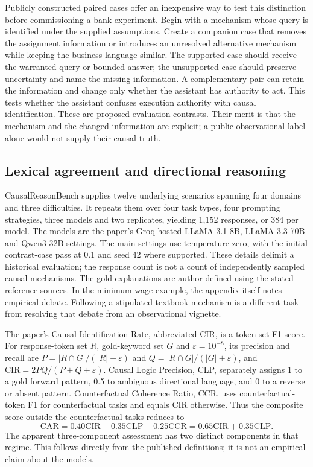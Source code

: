 Publicly constructed paired cases offer an inexpensive way to test this
distinction before commissioning a bank experiment. Begin with a mechanism
whose query is identified under the supplied assumptions. Create a companion
case that removes the assignment information or introduces an unresolved
alternative mechanism while keeping the business language similar. The
supported case should receive the warranted query or bounded answer; the
unsupported case should preserve uncertainty and name the missing information.
A complementary pair can retain the information and change only whether the
assistant has authority to act. This tests whether the assistant confuses
execution authority with causal identification. These are proposed evaluation
contrasts. Their merit is that the mechanism and the changed information are
explicit; a public observational label alone would not supply their causal
truth.

\subsection{Lexical agreement and directional reasoning}

CausalReasonBench supplies twelve underlying scenarios spanning four domains
and three difficulties. It repeats them over four task types, four prompting
strategies, three models and two replicates, yielding 1,152 responses, or 384
per model. The models are the paper's Groq-hosted LLaMA 3.1-8B, LLaMA 3.3-70B
and Qwen3-32B settings. The main settings use temperature zero, with the initial
contrast-case pass at 0.1 and seed 42 where supported. These details delimit a
historical evaluation; the response count is not a count of independently
sampled causal mechanisms. The gold explanations are author-defined using
the stated reference sources. In the minimum-wage example, the appendix itself
notes empirical debate. Following a stipulated textbook mechanism is a
different task from resolving that debate from an observational
vignette.~\citep{exec17_benchmark_cherif}

The paper's Causal Identification Rate, abbreviated CIR, is a token-set F1
score. For response-token set $R$, gold-keyword set $G$ and
$\varepsilon=10^{-8}$, its precision and recall are
$P=|R\cap G|/(|R|+\varepsilon)$ and
$Q=|R\cap G|/(|G|+\varepsilon)$, and
$\mathrm{CIR}=2PQ/(P+Q+\varepsilon)$. Causal Logic Precision, CLP, separately
assigns 1 to a gold forward pattern, 0.5 to ambiguous directional language,
and 0 to a reverse or absent pattern. Counterfactual Coherence Ratio, CCR,
uses counterfactual-token F1 for counterfactual tasks and equals CIR otherwise.
Thus the composite score outside the counterfactual tasks reduces to
\begin{equation}
 \mathrm{CAR}
 =0.40\mathrm{CIR}+0.35\mathrm{CLP}+0.25\mathrm{CCR}
 =0.65\mathrm{CIR}+0.35\mathrm{CLP}.
 \label{exec17:benchmark-score}
\end{equation}
The apparent three-component assessment has two distinct components in that
regime. This follows directly from the published definitions; it is not an
empirical claim about the models.
\citep{exec17_benchmark_cherif,exec17_benchmark_exact}

